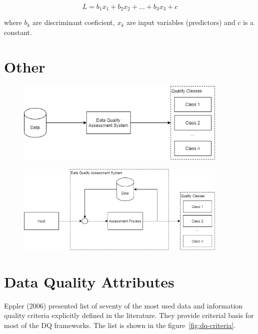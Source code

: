 \begin{equation*}
    L = b_1 x_1 + b_2 x_2 + \ldots + b_3 x_3 + c
\end{equation*}

where \( b_k \) are discriminant coeficient, \( x_k \) are input variables (predictors) and \( c \) is a constant.

\newpage
\section{Other}

\begin{figure}[htb]
    \centering
    \includegraphics[width=0.9\textwidth]{figures/dq-simple.png}
    \caption{}
    \label{fig:dq-simple}
\end{figure}
\FloatBarrier

\begin{figure}[htb]
    \centering
    \includegraphics[width=0.9\textwidth]{figures/dq-system.png}
    \caption{}
    \label{fig:dq-system}
\end{figure}
\FloatBarrier

\section{Data Quality Attributes}

Eppler (2006) presented list of seventy of the most used data and information quality criteria explicitly defined in the literature.
They provide criterial basis for most of the DQ frameworks.
The list is shown in the figure~\ref{fig:dq-criteria}.

